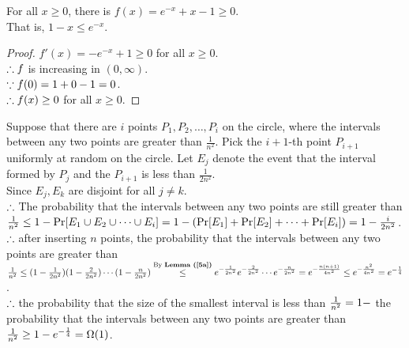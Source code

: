 \begin{pr}
\begin{lm}\label{5a}
For all $x\geq0$, there is $f(x)=e^{-x}+x-1\geq0$.\\
That is, $1-x\leq e^{-x}$.
\begin{proof}
$f'(x)=-e^{-x}+1\geq0$ for all $x\geq0$.\\
$\so f$ is increasing in $(0, \infty)$.\\
$\cuz f(0)=1+0-1=0$.\\
$\so f(x)\geq0$ for all $x\geq0$.
\end{proof}
\end{lm}
Suppose that there are $i$ points $P_1, P_2, \dots, P_i$ on the circle, where the intervals between any two points are greater than $\frac1{n^2}$. Pick the $i+1$-th point $P_{i+1}$ uniformly at random on the circle. Let $E_j$ denote the event that the interval formed by $P_j$ and the $P_{i+1}$ is less than $\frac1{2n^2}$.\\
Since $E_j, E_k$ are disjoint for all $j\neq k$.\\
$\so$ The probability that the intervals between any two points are still greater than $\frac1{n^2}\leq1-\P[E_1\cup E_2\cup\cdots\cup E_i]=1-(\P[E_1]+\P[E_2]+\cdots+\P[E_i])=1-\frac i{2n^2}$.\\
$\so$ after inserting $n$ points, the probability that the intervals between any two points are greater than $\frac1{n^2}\leq(1-\frac1{2n^2})(1-\frac2{2n^2})\cdots(1-\frac n{2n^2})\overtext{By \rflm{5a}}\leq e^{-\frac1{2n^2}}e^{-\frac2{2n^2}}\cdots e^{-\frac n{2n^2}}=e^{-\frac{n(n+1)}{4n^2}}\leq e^{-\frac{n^2}{4n^2}}=e^{-\frac14}$.\\
$\so$ the probability that the size of the smallest interval is less than $\frac1{n^2}\\
=1-$ the probability that the intervals between any two points are greater than $\frac1{n^2}\\
\geq1-e^{-\frac14}=\Omega(1)$.
\end{pr}
